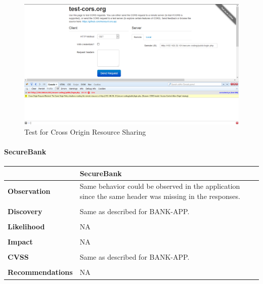 \begin{figure}[ht]
	\centering
		\includegraphics[width=.8\linewidth]{figures/OTG-CLIENT-007.png}
		\caption{Test for Cross Origin Resource Sharing}
	\label{fig:test_cors}
\end{figure}

\clearpage
\paragraph{SecureBank} \mbox{}
\begin{longtable*}{p{.20\textwidth} | p{.75\textwidth}}
    \hline
    & \textbf{SecureBank} \\
    \hline
    \textbf{Observation} &
        Same behavior could be observed in the application since the same header was missing in the responses.
    \\\\
    \textbf{Discovery} &
    Same as described for BANK-APP.
    \\\\
    \textbf{Likelihood} &
        NA
    \\\\
    \textbf{Impact} &
		NA
    \\\\
    \textbf{CVSS} &
		Same as described for BANK-APP.
    \\\\
    \textbf{Recommendations} &
    NA
    \\
    \hline
\end{longtable*}
\clearpage